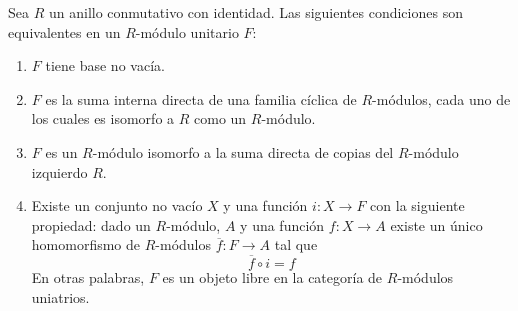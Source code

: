 \documentclass[12pt]{report}
\newcounter{it}
\theoremstyle{largebreak}
\newcommand\cf[3]{\ensuremath{#1:#2\rightarrow#3}}
\begin{document}
    \begin{theor}
        Sea $R$ un anillo conmutativo con identidad. Las siguientes condiciones son equivalentes en un $R$-módulo unitario $F$:
        \renewcommand{\theenumi}{\roman{enumi}}
        \begin{enumerate}
            \item $F$ tiene base no vacía.
            \item $F$ es la suma interna directa de una familia cíclica de $R$-módulos, cada uno de los cuales es isomorfo a $R$ como un $R$-módulo.
            \item $F$ es un $R$-módulo isomorfo a la suma directa de copias del $R$-módulo izquierdo $R$.
            \item Existe un conjunto no vacío $X$ y una función $\cf{i}{X}{F}$ con la siguiente propiedad: dado un $R$-módulo, $A$ y una función $\cf{f}{X}{A}$ existe un único homomorfismo de $R$-módulos $\cf{\overline{f}}{F}{A}$ tal que
            \begin{equation*}
                \overline{f}\circ i=f
            \end{equation*}
            En otras palabras, $F$ es un objeto libre en la categoría de $R$-módulos uniatrios.
        \end{enumerate}
    \end{theor}
\end{document}
